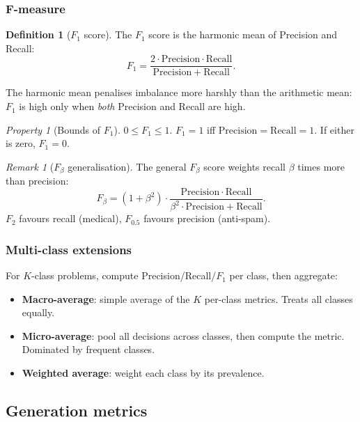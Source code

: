 \documentclass[12pt,a4paper]{report}
\theoremstyle{definition}
\newtheorem{definition}{Definition}[section]
\theoremstyle{remark}
\newtheorem{remark}{Remark}[section]
\newtheorem{property}{Property}[section]
\begin{document}
\subsubsection*{F-measure}

\begin{definition}[$F_1$ score]
The $F_1$ score is the harmonic mean of Precision and Recall:
\[ F_1 = \frac{2 \cdot \mathrm{Precision} \cdot \mathrm{Recall}}{\mathrm{Precision} + \mathrm{Recall}}. \]
\end{definition}

The harmonic mean penalises imbalance more harshly than the arithmetic mean: $F_1$ is high only when \emph{both} Precision and Recall are high.

\begin{property}[Bounds of $F_1$]
$0 \le F_1 \le 1$. $F_1 = 1$ iff $\mathrm{Precision} = \mathrm{Recall} = 1$. If either is zero, $F_1 = 0$.
\end{property}

\begin{remark}[$F_\beta$ generalisation]
The general $F_\beta$ score weights recall $\beta$ times more than precision:
\[ F_\beta = (1 + \beta^2) \cdot \frac{\mathrm{Precision} \cdot \mathrm{Recall}}{\beta^2 \cdot \mathrm{Precision} + \mathrm{Recall}}. \]
$F_2$ favours recall (medical), $F_{0.5}$ favours precision (anti-spam).
\end{remark}

\subsubsection*{Multi-class extensions}

For $K$-class problems, compute Precision/Recall/$F_1$ per class, then aggregate:
\begin{itemize}
    \item \textbf{Macro-average}: simple average of the $K$ per-class metrics. Treats all classes equally.
    \item \textbf{Micro-average}: pool all decisions across classes, then compute the metric. Dominated by frequent classes.
    \item \textbf{Weighted average}: weight each class by its prevalence.
\end{itemize}

\subsection{Generation metrics}
\label{sec:eval-generation}
\end{document}
